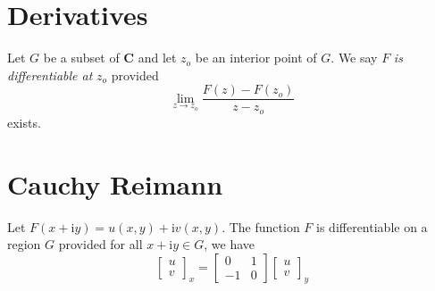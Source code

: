 \documentclass[letterpaper,landscape,9pt,fleqn]{extarticle}
\newcommand{\complex}{\mathbf{C}}
\newcommand{\im}{\mathrm{i}}
\begin{document}
\begin{multicols*}{3}
\section*{Derivatives}
Let $G$ be a subset of $\complex$ and let $z_o$ be an interior point of $G$. We say $F$ \emph{is differentiable at} $z_o$ provided 
\begin{equation*}
  \lim_{z\to z_o} \frac{F(z) - F(z_o)}{z-z_o}
\end{equation*}
exists.

\section*{Cauchy Reimann}
Let  $F(x+\im y) = u(x,y) + \im v(x,y)$. The function $F$
is differentiable on a region $G$ provided for all
$x + \im y \in G$, we have
\begin{equation*}
\begin{bmatrix} u \\  v \end{bmatrix}_x = 
\begin{bmatrix} 0 & 1 \\ -1 & 0 \end{bmatrix}
\begin{bmatrix} u \\  v \end{bmatrix}_y 
\end{equation*}
\vfill
{}
\end{multicols*}%
\end{document}
